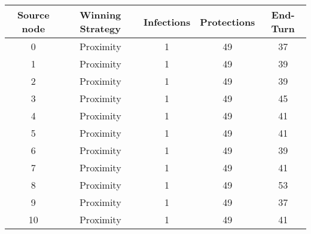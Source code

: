 \documentclass[results.tex]{subfiles}
\begin{document}
    \begin{center}
        \begin{tabular}{| c || c | c | c | c |}
            \hline
            {\bfseries Source node} & {\bfseries Winning Strategy} & {\bfseries Infections} & {\bfseries Protections}
            & {\bfseries End-Turn}
            \\  %
            \hline\hline
            0                       & Proximity                    & 1                      & 49                      & 37                   \\
            \hline
            1                       & Proximity                    & 1                      & 49                      & 39                   \\
            \hline
            2                       & Proximity                    & 1                      & 49                      & 39                   \\
            \hline
            3                       & Proximity                    & 1                      & 49                      & 45                   \\
            \hline
            4                       & Proximity                    & 1                      & 49                      & 41                   \\
            \hline
            5                       & Proximity                    & 1                      & 49                      & 41                   \\
            \hline
            6                       & Proximity                    & 1                      & 49                      & 39                   \\
            \hline
            7                       & Proximity                    & 1                      & 49                      & 41                   \\
            \hline
            8                       & Proximity                    & 1                      & 49                      & 53                   \\
            \hline
            9                       & Proximity                    & 1                      & 49                      & 37                   \\
            \hline
            10                      & Proximity                    & 1                      & 49                      & 41                   \\

\end{tabular}
\end{center}
\end{document}
